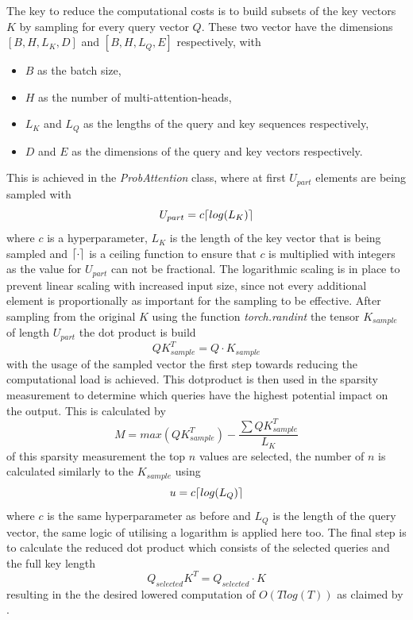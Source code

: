 \documentclass{article}
\DeclarePairedDelimiter{\ceil}{\lceil}{\rceil}
\begin{document}
The key to reduce the computational costs is to build subsets of the key vectors $K$ by sampling for every query vector $Q$. These two vector have the dimensions $[B,H,L_K,D]$ and $[B,H,L_Q,E]$ respectively, with
\begin{itemize}
    \item $B$ as the batch size,
    \item $H$ as the number of multi-attention-heads,
    \item $L_K$ and $L_Q$ as the lengths of the query and key sequences respectively,
    \item $D$ and $E$ as the dimensions of the query and key vectors respectively.
\end{itemize}
This is achieved in the \textit{ProbAttention} class, where at first $U_{part}$ elements are being sampled with
\begin{equation}
    U_{part} = c \ceil*{log(L_K)}
\end{equation}
where $c$ is a hyperparameter, $L_K$ is the length of the key vector that is being sampled and $\ceil*{\cdot}$ is a ceiling function to ensure that $c$ is multiplied with integers as the value for $U_{part}$ can not be fractional. The logarithmic scaling is in place to prevent linear scaling with increased input size, since not every additional element is proportionally as important for the sampling to be effective. After sampling from the original $K$ using the function \textit{torch.randint} the tensor $K_{sample}$ of length $U_{part}$ the dot product is build
\begin{equation}
    QK^{T}_{sample} = Q \cdot K_{sample}
\end{equation}
with the usage of the sampled vector the first step towards reducing the computational load is achieved. This dotproduct is then used in the sparsity measurement to determine which queries have the highest potential impact on the output. This is calculated by
\begin{equation}
    M = max\left(QK^{T}_{sample}\right) - \frac{\sum QK^{T}_{sample}}{L_K}
\end{equation}
of this sparsity measurement the top $n$ values are selected, the number of $n$ is calculated similarly to the $K_{sample}$ using
\begin{equation}
    u = c \ceil*{log(L_Q)}
\end{equation}
where $c$ is the same hyperparameter as before and $L_Q$ is the length of the query vector, the same logic of utilising a logarithm is applied here too. The final step is to calculate the reduced dot product which consists of the selected queries and the full key length
\begin{equation}
    Q_{selected}K^{T} = Q_{selected} \cdot K
\end{equation}
resulting in the the desired lowered computation of $O(T log(T))$ as claimed by \cite{Informer}. \par 
\end{document}
